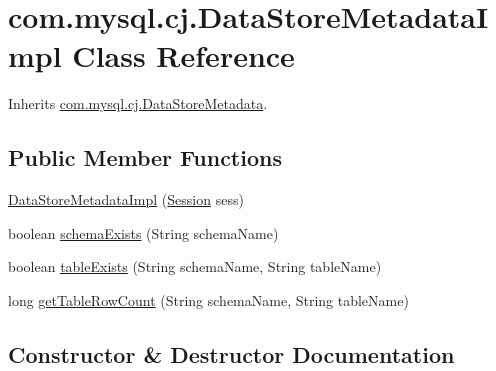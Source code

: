 \hypertarget{classcom_1_1mysql_1_1cj_1_1_data_store_metadata_impl}{}\section{com.\+mysql.\+cj.\+Data\+Store\+Metadata\+Impl Class Reference}
\label{classcom_1_1mysql_1_1cj_1_1_data_store_metadata_impl}


Inherits \mbox{\hyperlink{interfacecom_1_1mysql_1_1cj_1_1_data_store_metadata}{com.\+mysql.\+cj.\+Data\+Store\+Metadata}}.

\subsection*{Public Member Functions}
\begin{DoxyCompactItemize}
\item 
\mbox{\hyperlink{classcom_1_1mysql_1_1cj_1_1_data_store_metadata_impl_aeff907c531b01c9e68318d8d800929e8}{Data\+Store\+Metadata\+Impl}} (\mbox{\hyperlink{interfacecom_1_1mysql_1_1cj_1_1_session}{Session}} sess)
\item 
boolean \mbox{\hyperlink{classcom_1_1mysql_1_1cj_1_1_data_store_metadata_impl_a56f0ee01f926da85fa6c7e692abd8ba1}{schema\+Exists}} (String schema\+Name)
\item 
boolean \mbox{\hyperlink{classcom_1_1mysql_1_1cj_1_1_data_store_metadata_impl_a4e68791d006063644a74604988f41c23}{table\+Exists}} (String schema\+Name, String table\+Name)
\item 
long \mbox{\hyperlink{classcom_1_1mysql_1_1cj_1_1_data_store_metadata_impl_a8fc9c60e1f7bb1d72c63bdad408a511a}{get\+Table\+Row\+Count}} (String schema\+Name, String table\+Name)
\end{DoxyCompactItemize}


\subsection{Constructor \& Destructor Documentation}
\mbox{\label{classcom_1_1mysql_1_1cj_1_1_data_store_metadata_impl_aeff907c531b01c9e68318d8d800929e8}} 
